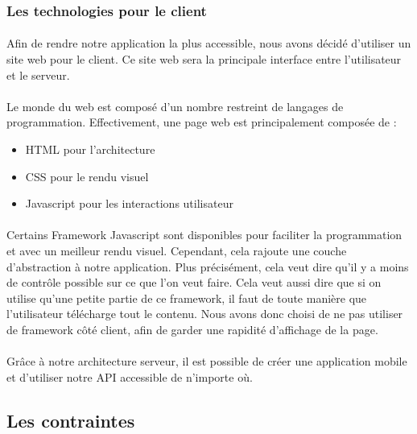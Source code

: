\documentclass[a4paper, 12pt]{article}
\begin{document}
\subsubsection{Les technologies pour le client}

\paragraph{}Afin de rendre notre application la plus accessible, nous avons décidé d’utiliser un site web pour le client. Ce site web sera la principale interface entre l’utilisateur et le serveur.
\paragraph{}Le monde du web est composé d’un nombre restreint de langages de programmation. Effectivement, une page web est principalement composée de :

\begin{itemize}
	\item HTML pour l’architecture
	\item CSS pour le rendu visuel
	\item Javascript pour les interactions utilisateur
\end{itemize}

\paragraph{}Certains Framework Javascript sont disponibles pour faciliter la programmation et avec un meilleur rendu visuel. Cependant, cela rajoute une couche d’abstraction à notre application. Plus précisément, cela veut dire qu’il y a moins de contrôle possible sur ce que l’on veut faire. Cela veut aussi dire que si on utilise qu’une petite partie de ce framework, il faut de toute manière que l’utilisateur télécharge tout le contenu. Nous avons donc choisi de ne pas utiliser de framework côté client, afin de garder une rapidité d’affichage de la page.
\paragraph{}Grâce à notre architecture serveur, il est possible de créer une application mobile et d’utiliser notre API accessible de n’importe où.

\subsection{Les contraintes}
\end{document}
